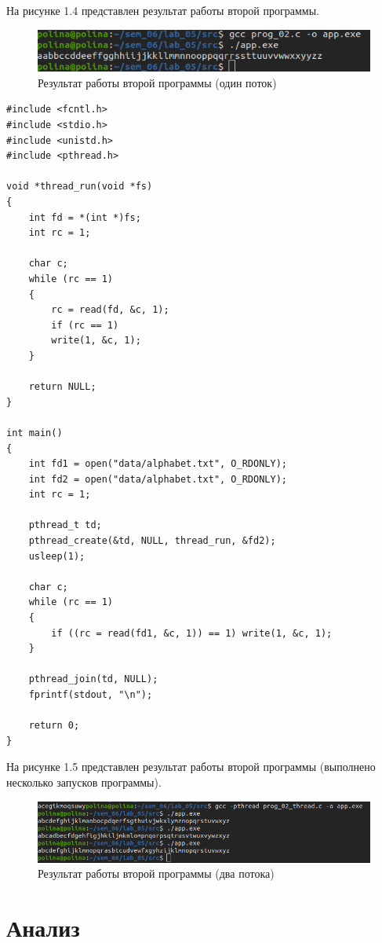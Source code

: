\documentclass[12pt,a4paper]{scrreprt}
\begin{document}
На рисунке 1.4 представлен результат работы второй программы.

\begin{figure}[H]
	\centering
	\includegraphics[scale=1.2]{pics/2_1.png}
	\caption{Результат работы второй программы (один поток)}
\end{figure}

\clearpage
\begin{lstlisting}[caption=Программа №2 (два потока)]
#include <fcntl.h>
#include <stdio.h>
#include <unistd.h>
#include <pthread.h>

void *thread_run(void *fs)
{
	int fd = *(int *)fs;
	int rc = 1;
	
	char c;
	while (rc == 1)
	{
		rc = read(fd, &c, 1);
		if (rc == 1)
		write(1, &c, 1);
	}
	
	return NULL;
}

int main()
{
	int fd1 = open("data/alphabet.txt", O_RDONLY);
	int fd2 = open("data/alphabet.txt", O_RDONLY);
	int rc = 1;
	
	pthread_t td;
	pthread_create(&td, NULL, thread_run, &fd2);
	usleep(1);
	
	char c;
	while (rc == 1)
	{
		if ((rc = read(fd1, &c, 1)) == 1) write(1, &c, 1);
	}
	
	pthread_join(td, NULL);
	fprintf(stdout, "\n");
	
	return 0;
}
\end{lstlisting}

На рисунке 1.5 представлен результат работы второй программы (выполнено несколько запусков программы).

\begin{figure}[H]
	\centering
	\includegraphics[scale=0.8]{pics/2_2.png}
	\caption{Результат работы второй программы (два потока)}
\end{figure}

\section{Анализ}
\end{document}
